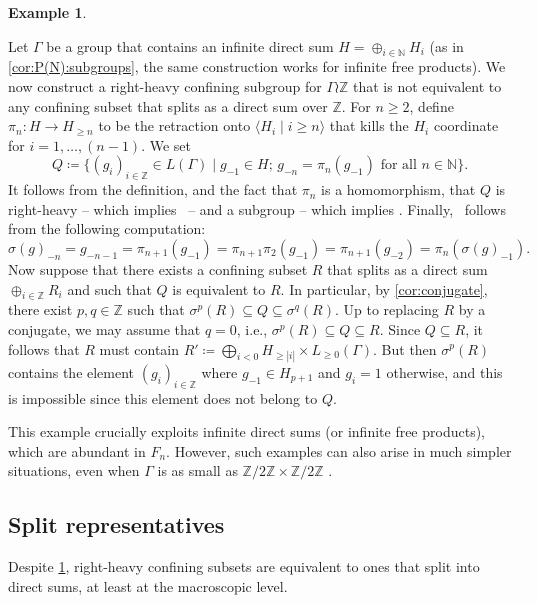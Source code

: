 \documentclass[reqno,12pt]{amsart}\setcounter{tocdepth}{1}
\theoremstyle{definition}
\newtheorem{example}[theorem]{Example}
\newcommand{\N}{\mathbb{N}}
\newcommand{\Z}{\mathbb{Z}}
\numberwithin{equation}{section}
\begin{document}
\begin{example}
\label{ex:nonsplit}

Let $\Gamma$ be a group that contains an infinite direct sum $H = \oplus_{i \in \N} H_i$ (as in \cref{cor:P(N):subgroups}, the same construction works for infinite free products). We now construct a right-heavy confining subgroup for $\Gamma \wr \Z$ that  is not equivalent to any confining subset that splits as a direct sum over $\Z$. For $n \geq 2$, define $\pi_n \colon H \to H_{\geq n}$ to be the retraction onto $\langle H_i \mid i \geq n \rangle$ that kills the $H_i$ coordinate for $i = 1, \ldots, (n-1)$. We set
\[Q \coloneqq \{ (g_i)_{i \in \Z} \in L(\Gamma) \mid g_{-1} \in H\text{; }g_{-n} = \pi_n(g_{-1}) \text{ for all } n\in\N\}.\]
It follows from the definition, and the fact that $\pi_n$ is a homomorphism, that  $Q$ is right-heavy -- which implies \GetInConf\ -- and a subgroup -- which implies \ProdConf. Finally, \StayInConf\ follows from the following computation:
\[
\sigma(g)_{-n} = g_{-n-1} = \pi_{n+1}(g_{-1}) = \pi_{n+1} \pi_2(g_{-1}) = \pi_{n+1}(g_{-2}) = \pi_n(\sigma(g)_{-1}).
\]
Now suppose that there exists a confining subset $R$ that splits as a direct sum $\oplus_{i \in \Z} R_i$ and such that $Q$ is equivalent to $R$. In particular, by \cref{cor:conjugate}, there exist $p, q \in \Z$ such that $\sigma^p(R) \subseteq Q \subseteq \sigma^q(R)$. Up to replacing $R$ by a conjugate, we may assume that $q = 0$, i.e., $\sigma^p(R) \subseteq Q \subseteq R$. Since $Q \subseteq R$, it follows that $R$ must contain $R' \coloneqq \bigoplus_{i < 0} H_{\geq |i|} \times L_{\geq 0} (\Gamma)$. But then $\sigma^p(R)$ contains the element $(g_i)_{i \in \Z}$ where $g_{-1} \in H_{p+1}$ and $g_i = 1$ otherwise, and this is impossible since this element does not belong to $Q$.
\end{example}

This example crucially exploits infinite direct sums (or infinite free products), which are abundant in $F_n$. However, such examples can also arise in much simpler situations, even when $\Gamma$ is as small as $\Z /2 \Z \times \Z / 2\Z$ \cite[Example 4.16]{sahana:wreath}.


\subsection{Split representatives}

 Despite \cref{ex:nonsplit}, right-heavy confining subsets are equivalent to ones that split into direct sums, at least at the macroscopic level.
\end{document}
